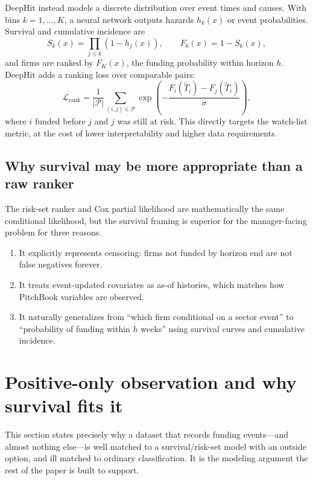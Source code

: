 \documentclass[11pt]{article}
\theoremstyle{plain}
\theoremstyle{definition}
\theoremstyle{remark}
\begin{document}
DeepHit instead models a discrete distribution over event times and causes. With bins $k=1,\ldots,K$, a neural network outputs hazards $h_k(x)$ or event probabilities. Survival and cumulative incidence are
\begin{equation}
S_k(x)=\prod_{j\le k}(1-h_j(x)),\qquad F_k(x)=1-S_k(x),
\end{equation}
and firms are ranked by $F_K(x)$, the funding probability within horizon $h$. DeepHit adds a ranking loss over comparable pairs:
\begin{equation}
\mathcal L_{\mathrm{rank}}
=\frac{1}{|\mathcal P|}\sum_{(i,j)\in\mathcal P}\exp\left(-\frac{F_i(\tilde T_i)-F_j(\tilde T_i)}{\sigma}\right),
\label{eq:deephit_rank}
\end{equation}
where $i$ funded before $j$ and $j$ was still at risk. This directly targets the watch-list metric, at the cost of lower interpretability and higher data requirements.

\subsection{Why survival may be more appropriate than a raw ranker}
The risk-set ranker and Cox partial likelihood are mathematically the same conditional likelihood, but the survival framing is superior for the manager-facing problem for three reasons.
\begin{enumerate}[leftmargin=1.5em]
\item It explicitly represents censoring: firms not funded by horizon end are not false negatives forever.
\item It treats event-updated covariates as as-of histories, which matches how PitchBook variables are observed.
\item It naturally generalizes from ``which firm conditional on a sector event'' to ``probability of funding within $h$ weeks'' using survival curves and cumulative incidence.
\end{enumerate}

\section{Positive-only observation and why survival fits it}
\label{sec:positives}

This section states precisely why a dataset that records funding events---and almost nothing else---is well matched to a survival/risk-set model with an outside option, and ill matched to ordinary classification. It is the modeling argument the rest of the paper is built to support.
\end{document}
